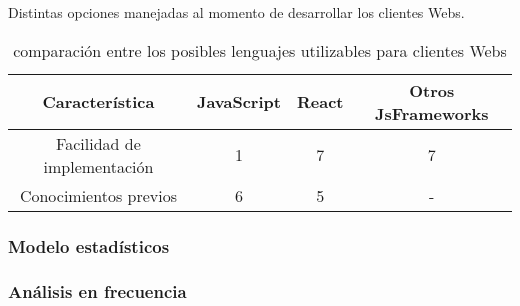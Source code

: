     \begin{table}[ht]
        \caption[Comparativa de posibles lenguajes nivel cliente Web]{comparación entre
        los posibles lenguajes utilizables para clientes Webs}
        \label{tab:LenguajesCliente}
        \begin{center}
            Distintas opciones manejadas al momento de desarrollar los clientes Webs.\\

            \vspace{0.3cm}
            \begin{tabular}{|c|c|c|c|}
                \hline
                Característica              & JavaScript & React & Otros JsFrameworks\\\hline
                Facilidad de implementación & 1         & 7     &  7\\\hline
                Conocimientos previos       & 6         & 5     &  - \\\hline
            \end{tabular}
        \end{center}
    \end{table}



    \subsubsection{Modelo estadísticos}

    \subsubsection{Análisis en frecuencia}


